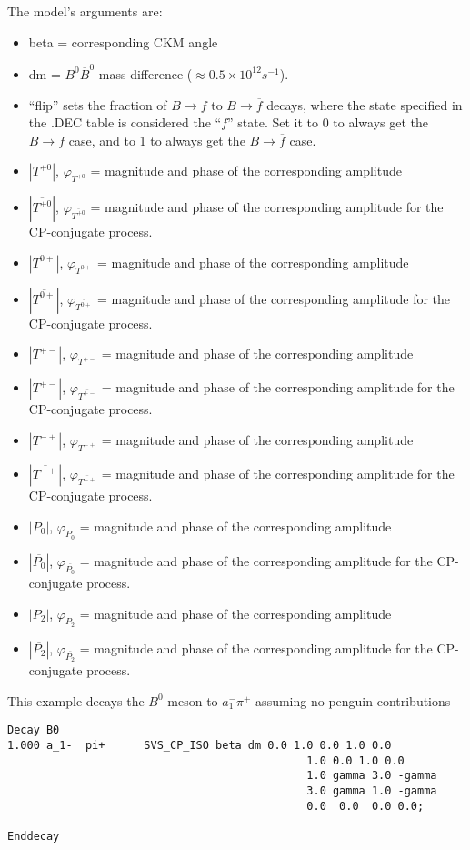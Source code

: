 The model's arguments are:
\begin{itemize}
\item
beta = corresponding CKM angle
\item
dm = $B^{0} \overline{B}^{0}$ mass difference ($\approx 0.5 \times 10^{12} s^{-1}$).   
\item
``flip'' sets the fraction of $B \rightarrow f$ to $B \rightarrow \overline{f}$ decays, where the state specified in the .DEC table is considered the ``$f$'' state.  Set it to 0 to always get the $B \rightarrow f$ case, and to 1 to always get the $B \rightarrow \overline{f}$ case.  
\item
$|T^{+0}|$, $\varphi_{T^{+0}}$  = magnitude and phase of the corresponding amplitude
\item
$|\overline{T^{+0}}|$, $\varphi_{\overline{T^{+0}}}$  = magnitude and phase of the corresponding amplitude for the CP-conjugate process.
\item
$|T^{0+}|$, $\varphi_{T^{0+}}$  = magnitude and phase of the corresponding amplitude
\item
$|\overline{T^{0+}}|$, $\varphi_{\overline{T^{0+}}}$  = magnitude and phase of the corresponding amplitude for the CP-conjugate process.
\item
$|T^{+-}|$, $\varphi_{T^{+-}}$  = magnitude and phase of the corresponding amplitude
\item
$|\overline{T^{+-}}|$, $\varphi_{\overline{T^{+-}}}$  = magnitude and phase of the corresponding amplitude for the CP-conjugate process.
\item
$|T^{-+}|$, $\varphi_{T^{-+}}$  = magnitude and phase of the corresponding amplitude
\item
$|\overline{T^{-+}}|$, $\varphi_{\overline{T^{-+}}}$  = magnitude and phase of the corresponding amplitude for the CP-conjugate process.
\item
$|P_{0}|$, $\varphi_{P_{0}}$  = magnitude and phase of the corresponding amplitude
\item
$|\overline{P_{0}}|$, $\varphi_{\overline{P_{0}}}$  = magnitude and phase of the corresponding amplitude for the CP-conjugate process.
\item
$|P_{2}|$, $\varphi_{P_{2}}$  = magnitude and phase of the corresponding amplitude
\item
$|\overline{P_{2}}|$, $\varphi_{\overline{P_{2}}}$  = magnitude and phase of the corresponding amplitude for the CP-conjugate process.
\end{itemize}

\Example
This example decays the $B^{0}$ meson to $a_{1}^{-} \pi^{+}$ assuming no penguin contributions
\begin{verbatim}
Decay B0
1.000 a_1-  pi+      SVS_CP_ISO beta dm 0.0 1.0 0.0 1.0 0.0
                                              1.0 0.0 1.0 0.0
                                              1.0 gamma 3.0 -gamma
                                              3.0 gamma 1.0 -gamma
                                              0.0  0.0  0.0 0.0;

Enddecay
\end{verbatim}


